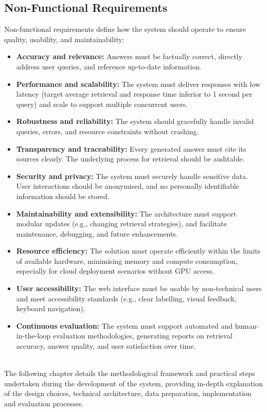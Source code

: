 \begin{spacing}{1.5}
\subsection{Non-Functional Requirements}
Non-functional requirements define how the system should operate to ensure quality, usability, and maintainability:
\begin{itemize}
    \item \textbf{Accuracy and relevance:} Answers must be factually correct, directly address user queries, and reference up-to-date information.
    \item \textbf{Performance and scalability:} The system must deliver responses with low latency (target average retrieval and response time inferior to 1 second per query) and scale to support multiple concurrent users.
    \item \textbf{Robustness and reliability:} The system should gracefully handle invalid queries, errors, and resource constraints without crashing.
    \item \textbf{Transparency and traceability:} Every generated answer must cite its sources clearly. The underlying process for retrieval should be auditable.
    \item \textbf{Security and privacy:} The system must securely handle sensitive data. User interactions should be anonymised, and no personally identifiable information should be stored.
    \item \textbf{Maintainability and extensibility:} The architecture must support modular updates (e.g., changing retrieval strategies), and facilitate maintenance, debugging, and future enhancements.
    \item \textbf{Resource efficiency:} The solution must operate efficiently within the limits of available hardware, minimising memory and compute consumption, especially for cloud deployment scenarios without GPU access.
    \item \textbf{User accessibility:} The web interface must be usable by non-technical users and meet accessibility standards (e.g., clear labelling, visual feedback, keyboard navigation).
    \item \textbf{Continuous evaluation:} The system must support automated and human-in-the-loop evaluation methodologies, generating reports on retrieval accuracy, answer quality, and user satisfaction over time.
\end{itemize}

\citep{abu_shawar_chatbots_2007,arslan_survey_2024,gupta_comprehensive_2024}\\


The following chapter details the methodological framework and practical steps undertaken during the development of the system, providing in-depth explanation of the design choices, technical architecture, data preparation, implementation and evaluation processes.


\end{spacing}
